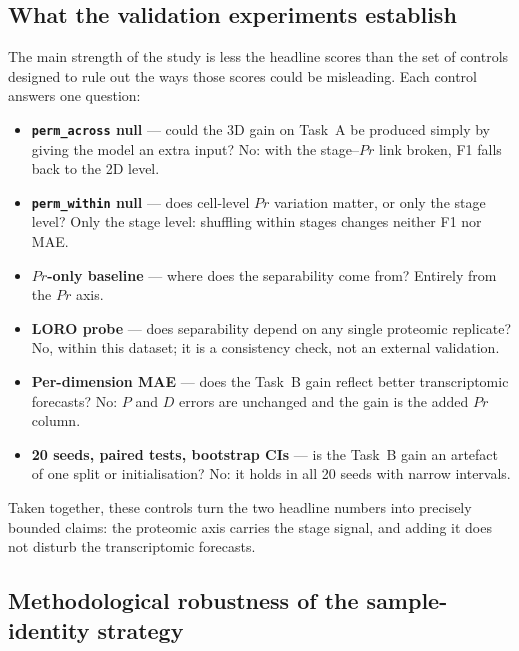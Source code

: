 \documentclass[5p,times,twocolumn]{elsarticle}
\newcommand{\rtag}[1]{}
\newcommand{\rev}[2]{\rtag{#1}#2}
\newenvironment{revblock}[1]{\par\rtag{#1}\ignorespaces}{\par}
\begin{document}
\subsection{\rev{R2.15,R1.10}{\textbf{What the validation
      experiments establish}}}
\label{sec:disc_validation}

\begin{revblock}{R2.15,R1.10}
  The main strength of the study is less the headline scores
  than the set of controls designed to rule out the ways those
  scores could be misleading. Each control answers one question:
  \begin{itemize}
    \item \textbf{\texttt{perm\_across} null} --- could the 3D
    gain on Task~A be produced simply by giving the model an
    extra input? No: with the stage--$Pr$ link broken, F1 falls
    back to the 2D level.
    \item \textbf{\texttt{perm\_within} null} --- does cell-level
    $Pr$ variation matter, or only the stage level? Only the
    stage level: shuffling within stages changes neither F1 nor
    MAE.
    \item \textbf{$Pr$-only baseline} --- where does the
    separability come from? Entirely from the $Pr$ axis.
    \item \textbf{LORO probe} --- does separability depend on
    any single proteomic replicate? No, within this dataset;
    it is a consistency check, not an external validation.
    \item \textbf{Per-dimension MAE} --- does the Task~B gain
    reflect better transcriptomic forecasts? No: $P$ and $D$
    errors are unchanged and the gain is the added $Pr$ column.
    \item \textbf{20 seeds, paired tests, bootstrap CIs} --- is
    the Task~B gain an artefact of one split or
    initialisation? No: it holds in all 20 seeds with narrow
    intervals.
  \end{itemize}
  Taken together, these controls turn the two headline numbers
  into precisely bounded claims: the proteomic axis carries the
  stage signal, and adding it does not disturb the
  transcriptomic forecasts.
\end{revblock}

\subsection{\textbf{Methodological robustness of the
    sample-identity strategy}}
\end{document}
